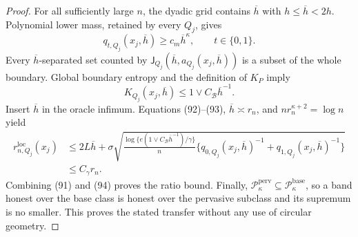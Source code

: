 \documentclass{article}
\begin{document}
\begin{proof}
For all sufficiently large \(n\), the dyadic grid contains
\(\overline h\) with \(h\le\overline h<2h\).  Polynomial lower mass,
retained by every \(Q_j\), gives
\[
 q_{t,Q_j}(x_j,\overline h)\ge c_m\overline h^\kappa,
 \qquad t\in\{0,1\}.
 \tag{92}
\]
Every \(\overline h\)-separated set counted by
\(\mathsf J_{Q_j}(\overline h,a_{Q_j}(x_j,\overline h))\) is a subset
of the whole boundary.  Global boundary entropy and the definition of
\(K_P\) imply
\[
 K_{Q_j}(x_j,\overline h)
 \le1\vee C_{\mathcal B}\overline h^{-1}.
 \tag{93}
\]
Insert \(\overline h\) in the oracle infimum.  Equations (92)--(93),
\(\overline h\asymp r_n\), and \(nr_n^{\kappa+2}=\log n\) yield
\[
 \begin{aligned}
 r_{n,Q_j}^{\mathrm{loc}}(x_j)
 &\le2L\overline h+
 \sigma\sqrt{\frac{\log\{e(1\vee C_{\mathcal B}\overline h^{-1})/
 \gamma\}}n
 \{q_{0,Q_j}(x_j,\overline h)^{-1}
   +q_{1,Q_j}(x_j,\overline h)^{-1}\}}\\
 &\le C_\gamma r_n.
 \end{aligned}
 \tag{94}
\]
Combining (91) and (94) proves the ratio bound.  Finally,
\(\mathcal P_{\kappa}^{\mathrm{perv}}\subseteq
\mathcal P_{\kappa}^{\mathrm{base}}\), so a band honest over the base
class is honest over the pervasive subclass and its supremum is no
smaller.  This proves the stated transfer without any use of circular
geometry.
\end{proof}
\end{document}
